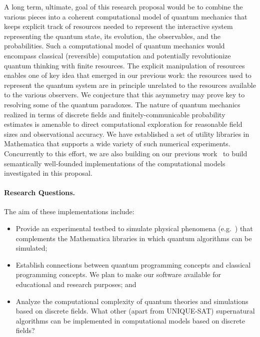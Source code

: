 \documentclass{article}
\theoremstyle{remark}
\begin{document}
A long term, ultimate, goal of this research proposal would be to
combine the various pieces into a coherent computational model of
quantum mechanics that keeps explicit track of resources needed to
represent the interactive system representing the quantum state, its
evolution, the observables, and the probabilities. Such a
computational model of quantum mechanics would encompass classical
(reversible) computation and potentially revolutionize quantum
thinking with finite resources. The explicit manipulation of resources
enables one of key idea that emerged in our previous work: the
resources used to represent the quantum system are in principle
unrelated to the resources available to the various observers. We
conjecture that this asymmetry may prove key to resolving some of the
quantum paradoxes.  The nature of quantum mechanics realized in terms
of discrete fields and finitely-communicable probability estimates is
amenable to direct computational exploration for reasonable field
sizes and observational accuracy. We have established a set of utility
libraries in Mathematica that supports a wide variety of such
numerical experiments. Concurrently to this effort, we are also
building on our previous work~\cite
{VDS2009,AGVS2007,AGVS2005,VAS2006,finiteQC,Sabry:2003:MQC:871895.871900}
to build semantically well-founded implementations of the
computational models investigated in this proposal.

\paragraph*{Research Questions.} The aim of these implementations
include:
\begin{itemize}
\item Provide an experimental testbed to simulate physical phenomena
  (e.g.~\cite {OrtizEtAl2001,SommEtAl2002}) that complements the
  Mathematica libraries in which quantum algorithms can be simulated;
\item Establish connections between quantum programming concepts and
  classical programming concepts. We plan to make our software
  available for educational and research purposes; and 
\item Analyze the computational complexity of quantum theories and
  simulations based on discrete fields. What other (apart from
  UNIQUE-SAT) supernatural algorithms can be implemented in
  computational models based on discrete fields?
\end{itemize}

\end{document}
